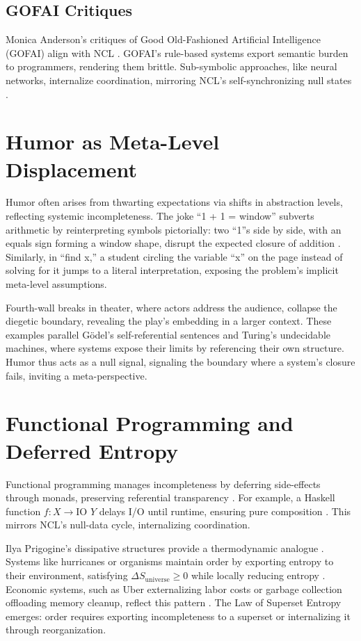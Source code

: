 \documentclass{article}
\begin{document}
\subsection{GOFAI Critiques}
Monica Anderson's critiques of Good Old-Fashioned Artificial Intelligence (GOFAI) align with NCL \citep{anderson2006}. GOFAI's rule-based systems export semantic burden to programmers, rendering them brittle. Sub-symbolic approaches, like neural networks, internalize coordination, mirroring NCL's self-synchronizing null states \citep{clark2013, hohwy2013}.

\section{Humor as Meta-Level Displacement}
\label{sec:humor}
Humor often arises from thwarting expectations via shifts in abstraction levels, reflecting systemic incompleteness. The joke ``1 + 1 = window'' subverts arithmetic by reinterpreting symbols pictorially: two ``1''s side by side, with an equals sign forming a window shape, disrupt the expected closure of addition \citep{ciupa2015}. Similarly, in ``find x,'' a student circling the variable ``x'' on the page instead of solving for it jumps to a literal interpretation, exposing the problem's implicit meta-level assumptions.

Fourth-wall breaks in theater, where actors address the audience, collapse the diegetic boundary, revealing the play's embedding in a larger context. These examples parallel G\"{o}del's self-referential sentences and Turing's undecidable machines, where systems expose their limits by referencing their own structure. Humor thus acts as a null signal, signaling the boundary where a system's closure fails, inviting a meta-perspective.

\section{Functional Programming and Deferred Entropy}
\label{sec:programming_entropy}
Functional programming manages incompleteness by deferring side-effects through monads, preserving referential transparency \citep{wadler1992}. For example, a Haskell function \( f : X \to \text{IO } Y \) delays I/O until runtime, ensuring pure composition \citep{turner1979}. This mirrors NCL's null-data cycle, internalizing coordination.

Ilya Prigogine's dissipative structures provide a thermodynamic analogue \citep{prigogine1984}. Systems like hurricanes or organisms maintain order by exporting entropy to their environment, satisfying \(\Delta S_{\text{universe}} \geq 0\) while locally reducing entropy \citep{nicolis1977}. Economic systems, such as Uber externalizing labor costs or garbage collection offloading memory cleanup, reflect this pattern \citep{schneider2005}. The Law of Superset Entropy emerges: order requires exporting incompleteness to a superset or internalizing it through reorganization.
\end{document}
